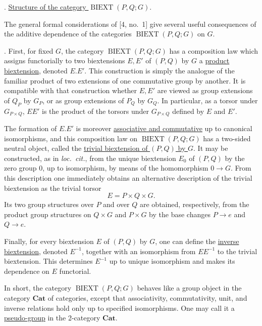 
. \underline{Structure of the category
$\operatorname{BIEXT}(P,Q;G)$}.

The general formal considerations of [4, no.~1] give several useful
consequences of the additive dependence of the categories
$\operatorname{BIEXT}(P,Q;G)$ on $G$.

. First, for fixed $G$, the category
$\operatorname{BIEXT}(P,Q;G)$ has a composition law which assigns
functorially to two biextensions $E,E'$ of $(P,Q)$ by $G$ a
\underline{product biextension}, denoted $E.E'$. This construction is
simply the analogue of the familiar product of two extensions of one
commutative group by another. It is compatible with that construction
whether $E,E'$ are viewed as group extensions of $Q_P$ by $G_P$, or
as group extensions of $P_Q$ by $G_Q$. In particular, as a torsor
under $G_{P\times Q}$, $EE'$ is the product of the torsors under
$G_{P\times Q}$ defined by $E$ and $E'$.

The formation of $E.E'$ is moreover \underline{associative and
commutative} up to canonical isomorphisms, and this composition law on
$\operatorname{BIEXT}(P,Q;G)$ has a two-sided neutral object, called
the \underline{trivial biextension of $(P,Q)$ by $G$}. It may be
constructed, as in \emph{loc.\ cit.}, from the unique biextension
$E_0$ of $(P,Q)$ by the zero group $0$, up to isomorphism, by means of
the homomorphism $0\longrightarrow G$. From this description one
immediately obtains an alternative description of the trivial
biextension as the trivial torsor
\[
 E=P\times Q\times G.
\]
Its two group structures over $P$ and over $Q$ are obtained,
respectively, from the product group structures on $Q\times G$ and
$P\times G$ by the base changes $P\longrightarrow e$ and
$Q\longrightarrow e$.

Finally, for every biextension $E$ of $(P,Q)$ by $G$, one can define
the \underline{inverse biextension}, denoted $E^{-1}$, together with
an isomorphism from $EE^{-1}$ to the trivial biextension. This
determines $E^{-1}$ up to unique isomorphism and makes its dependence
on $E$ functorial.

In short, the category $\operatorname{BIEXT}(P,Q;G)$ behaves like a
group object in the category $\mathbf{Cat}$ of categories, except that
associativity, commutativity, unit, and inverse relations hold only up
to specified isomorphisms. One may call it a
\underline{pseudo-group} in the 2-category $\mathbf{Cat}$.

